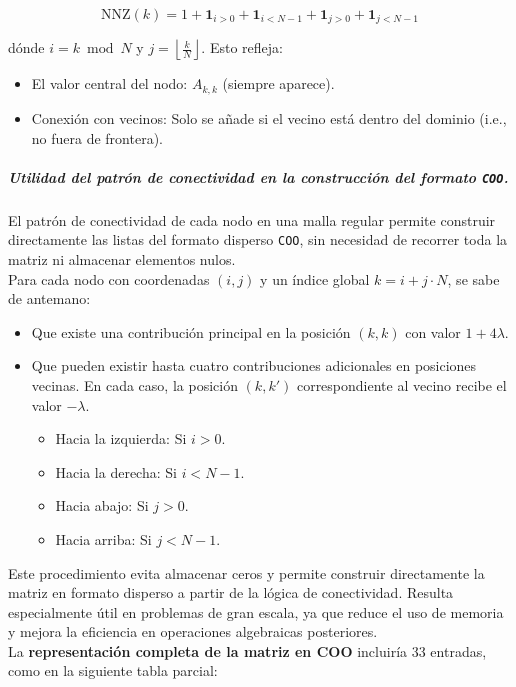 \documentclass{article}
\begin{document}
$$
\text{NNZ}(k) = 1 + \mathbf{1}_{i > 0} + \mathbf{1}_{i < N - 1} + \mathbf{1}_{j > 0} + \mathbf{1}_{j < N - 1}
$$

\noindent dónde $i = k \bmod N$ y $j = \left\lfloor \frac{k}{N} \right\rfloor$. Esto refleja:
\begin{itemize}
    \item El valor central del nodo: $A_{k,k}$ (siempre aparece).
    \item Conexión con vecinos: Solo se añade si el vecino está dentro del dominio (i.e., no fuera de frontera).
\end{itemize}

\subparagraph{Utilidad del patrón de conectividad en la construcción del formato \texttt{COO}.} El patrón de conectividad de cada nodo en una malla regular permite construir directamente las listas del formato disperso \texttt{COO}, sin necesidad de recorrer toda la matriz ni almacenar elementos nulos.\\

\noindent Para cada nodo con coordenadas $(i, j)$ y un índice global $k = i + j \cdot N$, se sabe de antemano:

\begin{itemize}
    \item Que existe una contribución principal en la posición $(k, k)$ con valor $1 + 4\lambda$.
    \item Que pueden existir hasta cuatro contribuciones adicionales en posiciones vecinas. En cada caso, la posición $(k, k')$ correspondiente al vecino recibe el valor $-\lambda$.
    \begin{itemize}
        \item Hacia la izquierda: Si $i > 0$.
        \item Hacia la derecha: Si $i < N - 1$.
        \item Hacia abajo: Si $j > 0$.
        \item Hacia arriba: Si $j < N - 1$.
    \end{itemize}
\end{itemize}
Este procedimiento evita almacenar ceros y permite construir directamente la matriz en formato disperso a partir de la lógica de conectividad. Resulta especialmente útil en problemas de gran escala, ya que reduce el uso de memoria y mejora la eficiencia en operaciones algebraicas posteriores.\\ 



\noindent La \textbf{representación completa de la matriz en COO} incluiría 33 entradas, como en la siguiente tabla parcial:
\end{document}
